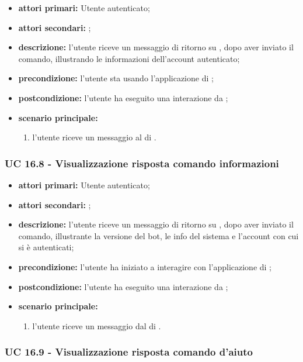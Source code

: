	\begin{itemize}
			\item \textbf{attori primari:} Utente autenticato;
			\item \textbf{attori secondari:} ;
			\item \textbf{descrizione:} l'utente riceve un messaggio di ritorno su , dopo aver inviato il comando, illustrando le informazioni dell'account autenticato;
			\item \textbf{precondizione:} l'utente sta usando l'applicazione di ;
			\item \textbf{postcondizione:} l'utente ha eseguito una interazione da ;
			\item \textbf{scenario principale:}
			\begin{enumerate}
				\item l'utente riceve un messaggio al  di .
			\end{enumerate}
		\end{itemize}

	\subsubsection{UC 16.8 - Visualizzazione risposta comando informazioni}

	\begin{itemize}
			\item \textbf{attori primari:} Utente autenticato;
			\item \textbf{attori secondari:} ;
			\item \textbf{descrizione:} l'utente riceve un messaggio di ritorno su , dopo aver inviato il comando, illustrante la versione del bot, le info del sistema e l'account con cui si è autenticati;
			\item \textbf{precondizione:} l'utente ha iniziato a interagire con l'applicazione di ;
			\item \textbf{postcondizione:} l'utente ha eseguito una interazione da ;
			\item \textbf{scenario principale:}
			\begin{enumerate}
				\item l'utente riceve un messaggio dal  di .
			\end{enumerate}
		\end{itemize}	

	\subsubsection{UC 16.9 - Visualizzazione risposta comando d'aiuto }

